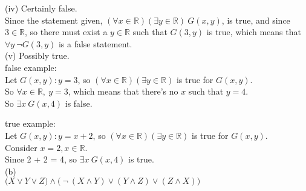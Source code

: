 \documentclass{article}
\begin{document}
(iv) Certainly false. \\[.15cm]
\indent\indent
Since the statement given, $(\forall x\in \mathbb{R})(\exists y\in \mathbb{R})\ G(x, y)$, is true, and since\\
\indent
$3\in\mathbb{R}$, so there must exist a $y\in\mathbb{R}$ such that $G(3, y)$ is true, which means that $\forall y\ \neg G(3,y)$ is a \indent false statement.\\[.15cm]

(v) Possibly true. \\[.15cm]
\indent\indent false example:\\
\indent\indent\indent\indent
Let $G(x, y): y = 3$, so $(\forall x\in \mathbb{R})(\exists y\in\mathbb{R})$ is true for $G(x, y)$.\\
\indent\indent\indent\indent
So $\forall x\in\mathbb{R},\ y = 3 $, which means that there's no $x$ such that $y = 4$.\\
\indent\indent\indent\indent
So $\exists x\ G(x, 4)$ is false.

\indent\indent true example:\\
\indent\indent\indent\indent
Let $G(x, y): y = x + 2$, so $(\forall x\in \mathbb{R})(\exists y\in \mathbb{R})$ is true for $G(x, y)$.\\
\indent\indent\indent\indent
Consider $x = 2, x \in\mathbb{R}$.\\
\indent\indent\indent\indent
Since 2 + 2 = 4, so $\exists x\ G(x, 4)$ is true. \\[.3cm]
(b)\\

$\Big(X\lor Y\lor Z\Big) \land \Big(\ \neg\ (X\land Y)\lor(Y\land Z)\lor(Z\land X) \Big)$
\end{document}
